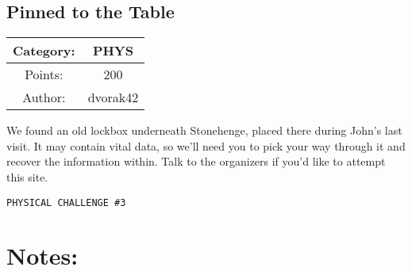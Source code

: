 \begin{center}
\section*{Pinned to the Table}
{\large
\begin{tabular}{| c c |}
\hline
Category: & PHYS\\\hline
Points: & 200\\\hline
Author: & dvorak42\\\hline
\end{tabular}
}
\end{center}
\vspace{0.5in}

{\large
We found an old lockbox underneath Stonehenge, placed there during John's last visit. It may contain vital data, so we'll need you to pick your way through it and recover the information within. Talk to the organizers if you'd like to attempt this site.
}
\vspace{0.25in}
\begin{center}
  {\Large\tt PHYSICAL CHALLENGE \#3}
\end{center}

\vspace{0.25in}
\section*{Notes:}

